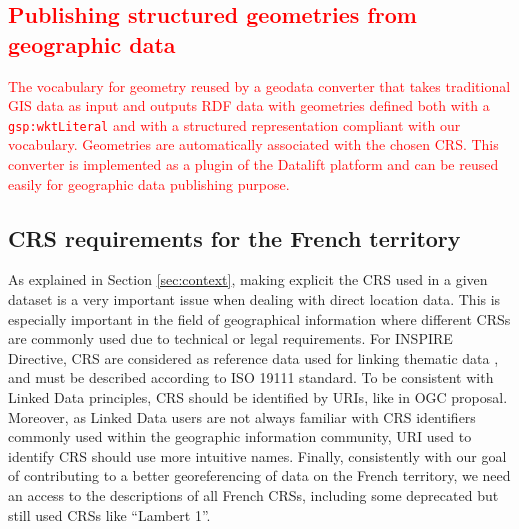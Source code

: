 \textcolor{red}{
\subsection{Publishing structured geometries from geographic data}
The vocabulary for geometry reused by a geodata converter that takes traditional GIS data as input and outputs RDF data with geometries defined both with a \texttt{gsp:wktLiteral} and with a structured representation compliant with our vocabulary. Geometries are automatically associated with the chosen CRS. This converter is implemented as a plugin of the Datalift platform  and can be reused easily for geographic data publishing purpose.
}

\subsection{CRS requirements for the  French territory} \label{sec:reqs}

As explained in Section \ref{sec:context}, making explicit the CRS used in a given dataset is a very important issue when dealing with direct location data. This is especially important in the field of geographical information where different CRSs are commonly used due to technical or legal requirements. For INSPIRE Directive, CRS are considered as reference data used for linking thematic data \cite{inspire2009}, and must be described according to ISO 19111 standard. To be consistent with Linked Data principles, CRS should be identified by URIs, like in OGC proposal. Moreover, as Linked Data users are not always familiar with CRS identifiers commonly used within the geographic information community, URI used to identify CRS should use more intuitive names. Finally, consistently with our goal of contributing to a better georeferencing of data on the French territory, we need an access to the descriptions of all French CRSs, including some deprecated but still used CRSs like ``Lambert 1''.



\begin{table}[!htp]
\end{table}

